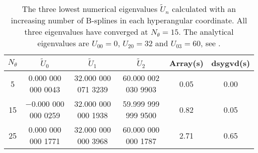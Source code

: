\begin{table}[h!]
	\centering
	\footnotesize
	\begin{adjustwidth}{-0.1cm}{}
	\tabcolsep=0.10cm
	\begin{tabular}{||c c c c c c||} 
		\hline
		$N_{\theta}$ & $\tilde{U}_0$ & $\tilde{U}_1$ & $\tilde{U}_2$ &  Array(s) & dsygvd(s)
		\Tstrut\Bstrut \\ [0.7ex]
		\hline\hline
		5	   & 0.000 000 000 0043   & 32.000 000 071 3239 & 60.000 002 030 9903 & 0.05 & 0.00  \\
		15     & $-$0.000 000 000 0259 & 32.000 000 000 1938 & 59.999 999 999 9500  & 0.82 & 0.05 \\
		25 & 0.000 000 000 1771 & 32.000 000 000 3968 & 60.000 000 000 1787& 2.71& 0.65 \\ [1ex] 
		\hline
	\end{tabular}
	\end{adjustwidth}
	\caption{The three lowest numerical eigenvalues $\tilde{U}_n$ calculated with an increasing number of B-splines in each hyperangular coordinate. All three eigenvalues have converged at $N_{\theta}=15$. The analytical eigenvalues are $U_{00}=0$, $U_{20}=32$ and $U_{03}=60$, see .}
	\label{table:2}
\end{table}
